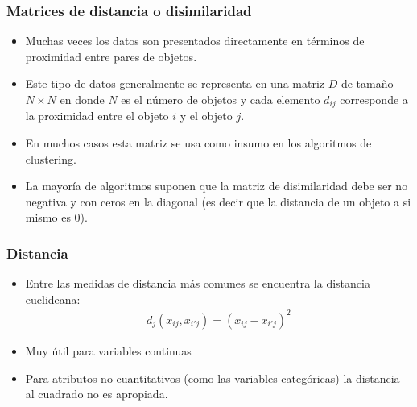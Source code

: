 \documentclass[
  shownotes,
  xcolor={svgnames},
  hyperref={colorlinks,citecolor=DarkBlue,linkcolor=DarkRed,urlcolor=DarkBlue}
  , aspectratio=169]{beamer}
\begin{document}
\begin{frame}
\frametitle{Matrices de distancia o disimilaridad}

\begin{itemize}
\item Muchas veces los datos son presentados directamente en términos de proximidad entre pares de objetos. 
\medskip
\item Este tipo de datos generalmente se representa en una matriz \(D\) de tamaño \(N\times N\) en donde \(N\) es el número de objetos y cada elemento \(d_{ij}\) corresponde a la proximidad entre el objeto \(i\) y el objeto \(j\).
\medskip
\item  En muchos casos esta matriz se usa como insumo en los algoritmos de clustering.
\medskip
\item La mayoría de algoritmos suponen que la matriz de disimilaridad debe ser no negativa y con ceros en la diagonal (es decir que la distancia de un
objeto a si mismo es 0). 
\end{itemize}






\end{frame}
\begin{frame}
\frametitle{Distancia}

\begin{itemize}


\item Entre las medidas de distancia más comunes se encuentra la distancia euclideana: 
\begin{align}
d_j(x_{ij}, x_{i'j}) = (x_{ij} - x_{i'j})^2
\end{align}

\item Muy útil para variables continuas
\medskip
\item Para atributos no cuantitativos (como las variables categóricas) la distancia al cuadrado no es apropiada. 

\end{itemize}

\end{frame}
\end{document}
